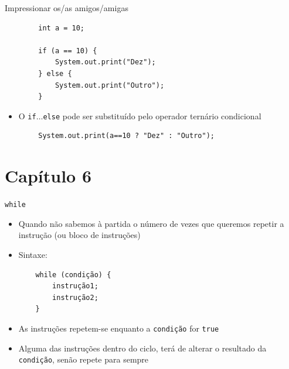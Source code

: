 \documentclass[portuguese, aspectratio=169, xcolor=table]{beamer}
\begin{document}
\begin{frame}[fragile]{Impressionar os/as amigos/amigas}



\begin{verbatim}
        int a = 10;
        
        if (a == 10) {
            System.out.print("Dez");
        } else {
            System.out.print("Outro");
        }
\end{verbatim}
\begin{itemize}
    \item O \texttt{if}$\ldots$\texttt{else} pode ser substituído pelo operador ternário condicional
\end{itemize}
\begin{verbatim}
        System.out.print(a==10 ? "Dez" : "Outro");
\end{verbatim}

\end{frame}

\section{Capítulo 6}

\begin{frame}[fragile]{\texttt{while}}
\begin{itemize}
    \item Quando não sabemos à partida o número de vezes que queremos repetir a instrução (ou bloco de instruções)
    \item Sintaxe:
    \begin{verbatim}
    while (condição) {
        instrução1;
        instrução2;
    }
    \end{verbatim}
    \item As instruções repetem-se enquanto a \texttt{condição} for \texttt{true}
    \item Alguma das instruções dentro do ciclo, terá de alterar o resultado da \texttt{condição}, senão repete para sempre
\end{itemize}
\end{frame}
\end{document}
